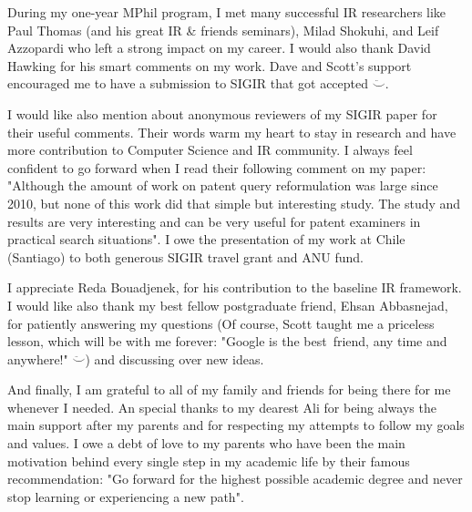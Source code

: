 During my one-year MPhil program, I met many successful IR researchers like Paul Thomas (and his great IR \& friends seminars), Milad Shokuhi, and Leif Azzopardi who left a strong impact on my career. I would also thank David Hawking for his smart comments on my work. Dave and Scott's support encouraged me to have a submission to SIGIR that got accepted $\ddot\smile$. 

I would like also mention about anonymous reviewers of my SIGIR paper  for their useful comments. Their words warm my heart to stay in research and have more contribution to Computer Science and IR community. I always feel confident to go forward when I read their following comment on my paper: "Although the amount of work on patent query reformulation was large since 2010, but none of this work did that simple but interesting study. The study and results are very interesting and can be very useful for patent examiners in practical search situations". I owe the presentation of my work at Chile (Santiago) to both generous SIGIR travel grant and ANU fund. 

I appreciate Reda Bouadjenek, for his contribution to the baseline IR framework. I would like also thank my best fellow postgraduate friend, Ehsan Abbasnejad, for patiently answering my questions (Of course, Scott taught me a priceless lesson, which will be with me forever: "Google is the best~friend, any time and anywhere!" $\ddot\smile$) and discussing over new ideas.

And finally, I am grateful to all of my family and friends for being there for me whenever I needed. An special thanks to my dearest Ali for being always the main support after my parents and for respecting my attempts to follow my goals and values. I owe a debt of love to my parents who have been the main motivation behind every single step in my academic life by their famous recommendation: "Go forward for the highest possible academic degree and never stop learning or experiencing a new path". 